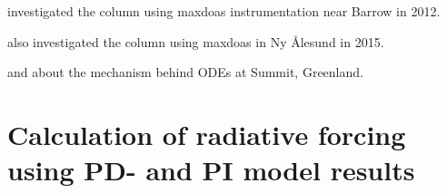 \medskip

\cite{Simpson2017} investigated the  column using \acrlong{maxdoas} instrumentation near Barrow in 2012.

\medskip

\cite{Luo2018} also investigated the  column using \acrshort{maxdoas} in Ny Ålesund in 2015. 

\medskip

\cite{Thomas2012} and \cite{Thomas2011} about the mechanism behind ODEs at Summit, Greenland. 

\section{Calculation of radiative forcing using PD- and PI model results}